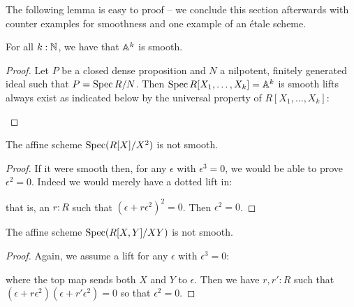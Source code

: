 The following lemma is easy to proof -- we conclude this section afterwards with counter examples for smoothness and one example of an étale scheme.

\begin{lemma}\label{An-is-smooth}
For all $k:\mathbb{N}$, we have that $\mathbb{A}^k$ is smooth.
\end{lemma}

\begin{proof}
  Let $P$ be a closed dense proposition and $N$ a nilpotent, finitely generated ideal such that $P=\operatorname{Spec} R/N$.
  Then $\operatorname{Spec} R[X_1,\dots,X_k]=\mathbb{A}^k$ is smooth lifts always exist as indicated below by the universal property of $R[X_1,\dots,X_k]$:
  \begin{center}
  \end{center}
\end{proof}

\begin{example}
The affine scheme $\operatorname{Spec}(R[X]/X^2)$ is not smooth.
\end{example}

\begin{proof}
If it were smooth then, for any $\epsilon$ with $\epsilon^3=0$, we would be able to prove $\epsilon^2=0$.
Indeed we would merely have a dotted lift in:
 \begin{center}
    \end{center}
    that is, an $r:R$ such that $(\epsilon+r\epsilon^2)^2=0$. Then $\epsilon^2=0$.
\end{proof}

\begin{example}
The affine scheme $\operatorname{Spec}(R[X,Y]/XY)$ is not smooth.
\end{example}

\begin{proof}
Again, we assume a lift for any $\epsilon$ with $\epsilon^3=0$:
 \begin{center}
 \end{center}
 where the top map sends both $X$ and $Y$ to $\epsilon$. Then we have $r,r':R$ such that $(\epsilon+r\epsilon^2)(\epsilon+r'\epsilon^2)=0$ so that $\epsilon^2=0$.
\end{proof}

